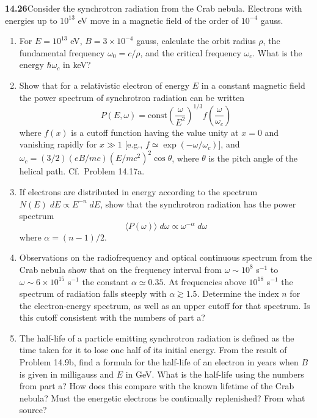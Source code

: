 \par\bigskip
\noindent\textbf{14.26}\quad Consider the synchrotron radiation from the Crab nebula. Electrons with energies up to $10^{13}$ eV move in a magnetic field of the order of $10^{-4}$ gauss.
\begin{enumerate}
\item[(a)] For $E=10^{13}$ eV, $B=3\times10^{-4}$ gauss, calculate the orbit radius $\rho$, the fundamental frequency $\omega_{0}=c/\rho$, and the critical frequency $\omega_{c}$. What is the energy $\hbar\omega_{c}$ in keV?
\item[(b)] Show that for a relativistic electron of energy $E$ in a constant magnetic field the power spectrum of synchrotron radiation can be written
\[
P(E,\omega)=\mathrm{const}\!\left(\frac{\omega}{E^{2}}\right)^{1/3}\!f\!\left(\frac{\omega}{\omega_{c}}\right)
\]
where $f(x)$ is a cutoff function having the value unity at $x=0$ and vanishing rapidly for $x\gg1$ [e.g., $f\simeq\exp(-\omega/\omega_{c})$], and $\omega_{c}=(3/2)(eB/mc)(E/mc^{2})^{2}\cos\theta$, where $\theta$ is the pitch angle of the helical path. Cf.~Problem 14.17a.
\item[(c)] If electrons are distributed in energy according to the spectrum $N(E)\;dE\propto E^{-n}\;dE$, show that the synchrotron radiation has the power spectrum
\[
\langle P(\omega)\rangle\;d\omega\propto\omega^{-\alpha}\;d\omega
\]
where $\alpha=(n-1)/2$.
\item[(d)] Observations on the radiofrequency and optical continuous spectrum from the Crab nebula show that on the frequency interval from $\omega\sim10^{8}$ s$^{-1}$ to $\omega\sim6\times10^{15}$ s$^{-1}$ the constant $\alpha\simeq0.35$. At frequencies above $10^{18}$ s$^{-1}$ the spectrum of radiation falls steeply with $\alpha\gtrsim1.5$. Determine the index $n$ for the electron-energy spectrum, as well as an upper cutoff for that spectrum. Is this cutoff consistent with the numbers of part a?
\item[(e)] The half-life of a particle emitting synchrotron radiation is defined as the time taken for it to lose one half of its initial energy. From the result of Problem 14.9b, find a formula for the half-life of an electron in years when $B$ is given in milligauss and $E$ in GeV. What is the half-life using the numbers from part a? How does this compare with the known lifetime of the Crab nebula? Must the energetic electrons be continually replenished? From what source?
\end{enumerate}
\solution

